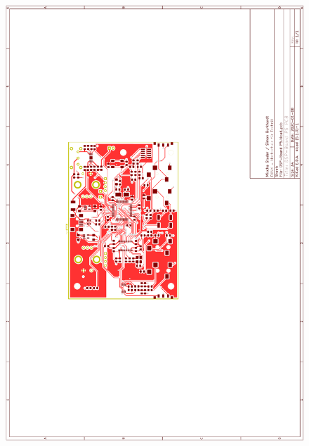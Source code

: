 \begin{appendix}
\begin{figure}[h!]
	\centering
	\includegraphics[width=0.95\linewidth]{appendix/DSP-Board PCB V1-1 (1).pdf}
\end{figure}


\end{appendix}
